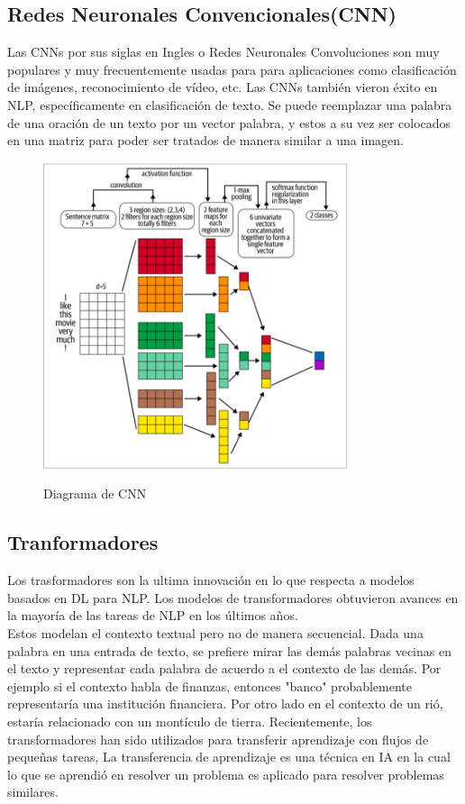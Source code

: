 \subsection{Redes Neuronales Convencionales(CNN)}
Las CNNs por sus siglas en Ingles o Redes Neuronales Convoluciones son muy populares y muy
frecuentemente usadas para
para aplicaciones como clasificación de imágenes, reconocimiento de vídeo, etc. Las CNNs también
vieron éxito en NLP,
específicamente en clasificación de texto. Se puede reemplazar una palabra de una oración de un
texto por un vector
palabra, y estos a su vez ser colocados en una matriz para poder ser tratados de manera similar a
una imagen.

\begin{figure}[H]
	\centering
	\includegraphics[width=0.8\textwidth]{imagenes/Cap 2/cnn.png}
	\caption{Diagrama de CNN}
	\label{fig:RNN}
	\cite{sowmya_practical_npl}
\end{figure}

\subsection{Tranformadores}

Los trasformadores son la ultima innovación en lo que respecta a modelos basados en DL para NLP.
Los
modelos de transformadores obtuvieron avances en la mayoría de las tareas de NLP en los últimos
años. \\
Estos modelan el contexto textual pero no de manera secuencial. Dada una palabra en una entrada de
texto, se
prefiere mirar las demás palabras vecinas en el texto y representar cada palabra de acuerdo a el
contexto
de las demás. Por ejemplo si el contexto habla de finanzas, entonces "banco" probablemente
representaría una
institución financiera. Por otro lado en el contexto de un rió, estaría relacionado con un
montículo de tierra.
Recientemente, los transformadores han sido utilizados para transferir aprendizaje con flujos de
pequeñas tareas,
La transferencia de aprendizaje es una técnica en IA en la cual lo que se aprendió en resolver un
problema es
aplicado para resolver problemas similares.


